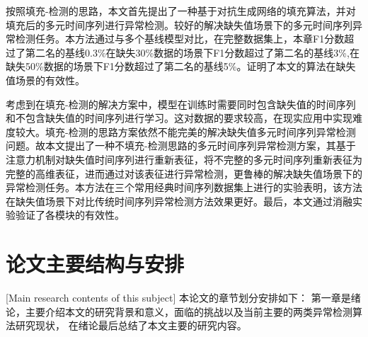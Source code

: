 按照填充-检测的思路，本文首先提出了一种基于对抗生成网络的填充算法，并对填充后的多元时间序列进行异常检测。较好的解决缺失值场景下的多元时间序列异常检测任务。本方法通过与多个基线模型对比，在完整数据集上，本章F1分数超过了第二名的基线0.3\%在缺失30\%数据的场景下F1分数超过了第二名的基线3\%,在缺失50\%数据的场景下F1分数超过了第二名的基线5\%。证明了本文的算法在缺失值场景的有效性。

考虑到在填充-检测的解决方案中，模型在训练时需要同时包含缺失值的时间序列和不包含缺失值的时间序列进行学习。这对数据的要求较高，在现实应用中实现难度较大。填充-检测的思路方案依然不能完美的解决缺失值多元时间序列异常检测问题。故本文提出了一种不填充-检测思路的多元时间序列异常检测方案，其基于注意力机制对缺失值时间序列进行重新表征，将不完整的多元时间序列重新表征为完整的高维表征，进而通过对该表征进行异常检测，更鲁棒的解决缺失值场景下的异常检测任务。本方法在三个常用经典时间序列数据集上进行的实验表明，该方法在缺失值场景下对比传统时间序列异常检测方法效果更好。最后，本文通过消融实验验证了各模块的有效性。



\section{论文主要结构与安排}[Main research contents of this subject]
本论文的章节划分安排如下： 第一章是绪论，主要介绍本文的研究背景和意义，面临的挑战以及当前主要的两类异常检测算法研究现状， 在绪论最后总结了本文主要的研究内容。

